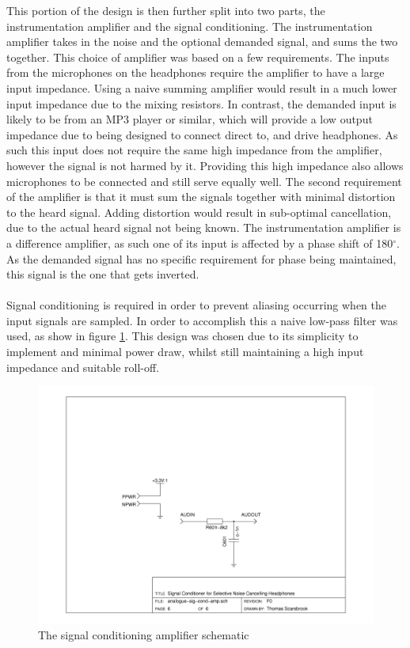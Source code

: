 \noindent This portion of the design is then further split into two parts, the instrumentation amplifier and the signal conditioning.
The instrumentation amplifier takes in the noise and the optional demanded signal, and sums the two together.
This choice of amplifier was based on a few requirements.
The inputs from the microphones on the headphones require the amplifier to have a large input impedance.
Using a naive summing amplifier would result in a much lower input impedance due to the mixing resistors.
In contrast, the demanded input is likely to be from an MP3 player or similar, which will provide a low output impedance due to being designed to connect direct to, and drive headphones.
As such this input does not require the same high impedance from the amplifier, however the signal is not harmed by it.
Providing this high impedance also allows microphones to be connected and still serve equally well.
The second requirement of the amplifier is that it must sum the signals together with minimal distortion to the heard signal.
Adding distortion would result in sub-optimal cancellation, due to the actual heard signal not being known.
The instrumentation amplifier is a difference amplifier, as such one of its input is affected by a phase shift of 180$^{\circ}$.
As the demanded signal has no specific requirement for phase being maintained, this signal is the one that gets inverted.
\\
\\
Signal conditioning is required in order to prevent aliasing occurring when the input signals are sampled.
In order to accomplish this a naive low-pass filter was used, as show in figure \ref{fig:sigcondsch}.
This design was chosen due to its simplicity to implement and minimal power draw, whilst still maintaining a high input impedance and suitable roll-off.

\begin{figure}[H]
	\centering
	\includegraphics[width=\textwidth]{./img/analogue-sig-cond-amp.png}
	\caption{The signal conditioning amplifier schematic}
	\label{fig:sigcondsch}
\end{figure}

